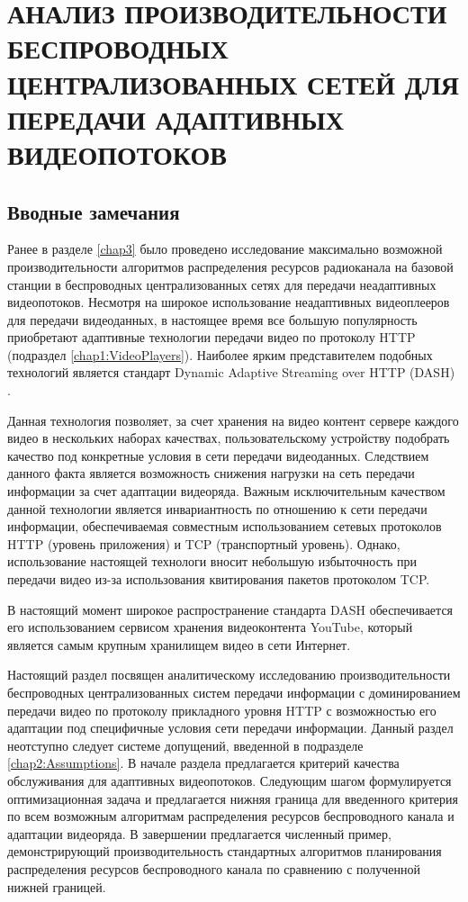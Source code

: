 \chapter{АНАЛИЗ ПРОИЗВОДИТЕЛЬНОСТИ БЕСПРОВОДНЫХ ЦЕНТРАЛИЗОВАННЫХ СЕТЕЙ ДЛЯ ПЕРЕДАЧИ АДАПТИВНЫХ ВИДЕОПОТОКОВ}
\label{chap4}

\section{Вводные замечания}
\label{chap4:Intro}

Ранее в разделе \ref{chap3} было проведено исследование максимально возможной производительности алгоритмов распределения ресурсов радиоканала на базовой станции в беспроводных централизованных сетях для передачи неадаптивных видеопотоков. Несмотря на широкое использование неадаптивных видеоплееров для передачи видеоданных, в настоящее время все большую популярность приобретают адаптивные технологии передачи видео по протоколу HTTP (подраздел \ref{chap1:VideoPlayers}). Наиболее ярким представителем подобных технологий является стандарт Dynamic Adaptive Streaming over HTTP (DASH) \cite{dash_standard,conviva}.

Данная технология позволяет, за счет хранения на видео контент сервере каждого видео в нескольких наборах качествах, пользовательскому устройству подобрать качество под конкретные условия в сети передачи видеоданных. Следствием данного факта является возможность снижения нагрузки на сеть передачи информации за счет адаптации видеоряда. Важным исключительным качеством данной технологии является инвариантность по отношению к сети передачи информации, обеспечиваемая совместным использованием сетевых протоколов HTTP (уровень приложения) и TCP (транспортный уровень). Однако, использование настоящей технологи вносит небольшую избыточность при передачи видео из-за использования квитирования пакетов протоколом TCP.

В настоящий момент широкое распространение стандарта DASH обеспечивается его использованием сервисом хранения видеоконтента YouTube, который является самым крупным хранилищем видео в сети Интернет.

Настоящий раздел посвящен аналитическому исследованию производительности беспроводных централизованных систем передачи информации с доминированием передачи видео по протоколу прикладного уровня HTTP с возможностью его адаптации под специфичные условия сети передачи информации. Данный раздел неотступно следует системе допущений, введенной в подразделе \ref{chap2:Assumptions}. В начале раздела предлагается критерий качества обслуживания для адаптивных видеопотоков. Следующим шагом формулируется оптимизационная задача и предлагается нижняя граница для введенного критерия по всем возможным алгоритмам распределения ресурсов беспроводного канала и адаптации видеоряда. В завершении предлагается численный пример, демонстрирующий производительность стандартных алгоритмов планирования распределения ресурсов беспроводного канала по сравнению с полученной нижней границей.

